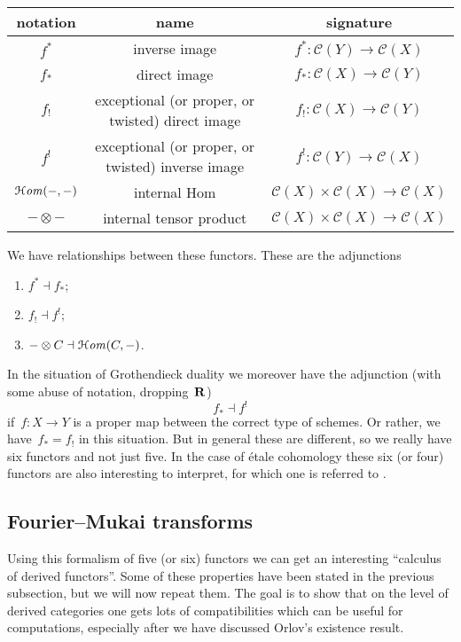 \documentclass[10pt,a4paper]{article}
\begin{document}
\begin{center}
  \begin{tabular}{ccc}
    \toprule
    notation & name & signature \\\midrule
    $f^*$ & inverse image & $f^*\colon\mathcal{C}(Y)\to\mathcal{C}(X)$ \\
    $f_*$ & direct image & $f_*\colon\mathcal{C}(X)\to\mathcal{C}(Y)$ \\
    $f_!$ & exceptional (or proper, or twisted) direct image & $f_!\colon\mathcal{C}(X)\to\mathcal{C}(Y)$ \\
    $f^!$ & exceptional (or proper, or twisted) inverse image & $f^!\colon\mathcal{C}(Y)\to\mathcal{C}(X)$ \\
    $\operatorname{\mathcal{H}\mathit{om}}(-,-)$ & internal Hom & $\mathcal{C}(X)\times\mathcal{C}(X)\to\mathcal{C}(X)$ \\
    $-\otimes-$ & internal tensor product & $\mathcal{C}(X)\times\mathcal{C}(X)\to\mathcal{C}(X)$ \\
    \bottomrule
  \end{tabular}
\end{center}

We have relationships between these functors. These are the adjunctions
\begin{enumerate}
  \item $f^*\dashv f_*$;
  \item $f_!\dashv f^!$;
  \item $-\otimes C\dashv \operatorname{\mathcal{H}\mathit{om}}(C,-)$.
\end{enumerate}
In the situation of Grothendieck duality we moreover have the adjunction (with some abuse of notation, dropping~$\mathbf{R}$)
\begin{equation}
  f_*\dashv f^!
\end{equation}
if~$f\colon X\to Y$ is a proper map between the correct type of schemes. Or rather, we have~$f_*=f_!$ in this situation. But in general these are different, so we really have six functors and not just five. In the case of \'etale cohomology these six (or four) functors are also interesting to interpret, for which one is referred to \cite{milne-etale-cohomology}.

\subsection{Fourier--Mukai transforms}
Using this formalism of five (or six) functors we can get an interesting ``calculus of derived functors''. Some of these properties have been stated in the previous subsection, but we will now repeat them. The goal is to show that on the level of derived categories one gets lots of compatibilities which can be useful for computations, especially after we have discussed Orlov's existence result.
\end{document}
